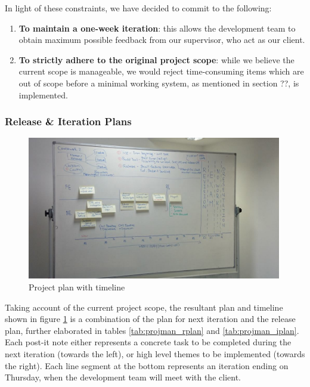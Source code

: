 ﻿\documentclass[a4paper, titlepage]{article}
\begin{document}
In light of these constraints, we have decided to commit to the following:
\begin{enumerate}
  \item \textbf{To maintain a one-week iteration}: this allows the development team to
        obtain maximum possible feedback from our supervisor, who act as our client.
  \item \textbf{To strictly adhere to the original project scope}: while we believe the
        current scope is manageable, we would reject time-consuming items which
        are out of scope before a minimal working system, as mentioned in section ??, is implemented.
\end{enumerate}

\subsubsection{Release \& Iteration Plans}

\begin{figure}[h]
  \centering
    \includegraphics[width = 0.99\textwidth]{./projman/timeline.jpg}
  \caption{Project plan with timeline}
  \label{fig:projman_timeline}
\end{figure}


Taking account of the current project scope, the resultant plan and timeline shown in figure 
\ref{fig:projman_timeline} is a
combination of the plan for next iteration and the release plan, further elaborated in tables 
\ref{tab:projman_rplan} and \ref{tab:projman_iplan}. Each post-it note either represents a 
concrete task to be completed during the next iteration (towards the left), or
high level themes to be implemented (towards the right). Each line segment at
the bottom represents an iteration ending on Thursday, when the development
team will meet with the client.
\end{document}

